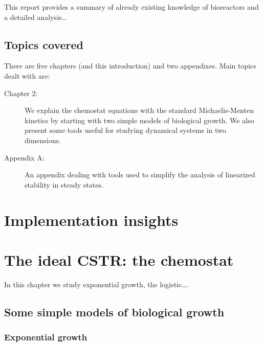 \documentclass[a4paper, 10pt, twoside, openright]{book}
\begin{document}
This report provides a summary of already
existing knowledge of bioreactors and a detailed analysis\ldots


\section{Topics covered}
There are five chapters (and this introduction)
and two appendixes. Main topics dealt with are: 

\begin{description} 
\item[Chapter 2:]{We explain the chemostat equations with the standard
    Michaelis-Menten kinetics by starting with two simple models of
    biological growth. We also present some tools useful for studying
    dynamical systems in two dimensions.}   
\item[Appendix A:]{An appendix dealing with tools used to simplify the
    analysis of linearized stability in steady states.}
\end{description}

\fi



\chapter{Implementation insights}
\chapter{The ideal CSTR: the chemostat}

\textsf{%
In this chapter we study exponential growth, the logistic\ldots .}

\section{Some simple models of biological growth}

\subsection{Exponential growth}
\end{document}
